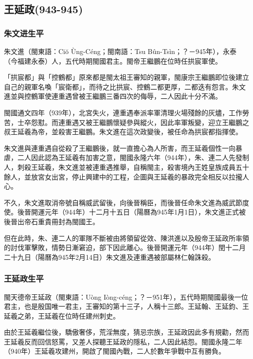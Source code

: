 
\subsection{王延政\tiny(943-945)}

\subsubsection{朱文进生平}

朱文進（閩東語：Ciŏ Ùng-Céng；閩南語：Tsu Bûn-Tsìn；？－945年），永泰（今福建永泰）人，五代時期閩國君主。閩帝王繼鵬在位時任拱宸軍使。

「拱宸都」與「控鶴都」原來都是閩太祖王審知的親軍，閩康宗王繼鵬即位後建立自己的親軍名喚「宸衛都」，而待之比拱宸、控鶴二都更厚，二都迭有怨言。朱文進並與控鶴軍使連重遇曾被王繼鵬三番四次的侮辱，二人因此十分不滿。

閩國通文四年（939年），北宮失火，連重遇奉派率軍清理火場殘餘的灰燼，工作勞苦，士卒怨懟。而連重遇又被王繼鵬懷疑參與縱火，因此率軍叛變，迎立王繼鵬之叔王延羲為帝，並殺害王繼鵬。朱文進在這次政變後，被任命為拱宸都指揮使。

朱文進與連重遇自從殺了王繼鵬後，就一直擔心為人所害，而王延羲個性一向暴虐，二人因此認為王延羲有加害之意，閩國永隆六年（944年），朱、連二人先發制人，刺殺王延羲，朱文進並被連重遇推舉，自稱閩主，殺害境內王姓皇族成員五十餘人，並放宮女出宮，停止興建中的工程，企圖與王延羲的暴政完全相反以拉攏人心。

不久，朱文進取消帝號自稱威武留後，向後晉稱臣，而後晉任命朱文進為威武節度使。後晉開運元年（944年）十二月十五日（陽曆為945年1月1日），朱文進正式被後晉出帝石重貴冊封為閩國王。

但在此時，朱、連二人的軍隊不斷被由將領留從效、陳洪進以及殷帝王延政所率領的討伐軍擊敗，情勢日漸窘迫，部下因此離心。後晉開運元年（944年）閏十二月二十九日（陽曆為945年2月14日）朱文進及連重遇被部屬林仁翰誅殺。

\subsubsection{王延政生平}

閩天德帝王延政（閩東語：Uòng Iòng-céng；？－951年），五代時期閩國最後一位君主，也是殷国唯一君主，王審知的第十三子，人稱十三郎。王延翰、王延鈞、王延羲之弟，王延羲在位時任建州刺史。

由於王延羲繼位後，驕傲奢侈，荒淫無度，猜忌宗族，王延政因此多有規勸，然而王延羲反而回信怒罵，又差人探聽王延政的隱私，二人因此結怨。閩國永隆二年（940年）王延羲攻建州，開啟了閩國內戰，二人於數年爭戰中互有勝負。

